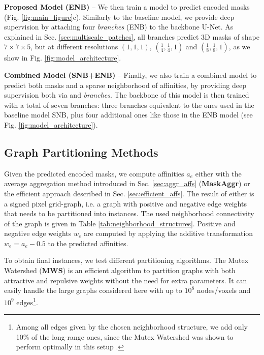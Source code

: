 \textbf{Proposed Model (ENB)} -- We then train a model to predict encoded \maskname masks (Fig. \ref{fig:main_figure}c). Similarly to the baseline model, we provide deep supervision by attaching four \emph{\encBr branches} (ENB) to the backbone U-Net. As explained in Sec. \ref{sec:multiscale_patches}, all branches predict 3D masks of shape $7 \times 7 \times 5$, but at different resolutions $(1,1,1)$, $(\frac{1}{4},\frac{1}{4},1)$ and $(\frac{1}{8},\frac{1}{8},1)$, as we show in Fig. \ref{fig:model_architecture}.

\textbf{Combined Model (SNB+ENB)} -- Finally, we also train a combined model to predict both \maskname masks and a sparse neighborhood of affinities, by providing deep supervision both via \emph{\encBr} and \emph{\sparseBr} \emph{branches}. The backbone of this model is then trained with a total of seven branches: three branches equivalent to the ones used in the baseline model SNB, plus four additional ones like those in the ENB model (see Fig. \ref{fig:model_architecture}).  

\subsection{Graph Partitioning Methods} 
Given the predicted encoded \maskname masks, we compute affinities $a_e$ either with the average aggregation method introduced in Sec. \ref{sec:aggr_affs} (\textbf{MaskAggr}) or the efficient approach described in Sec. \ref{sec:efficient_affs}. 
The result of either is a signed pixel grid-graph, i.e. a graph with positive and negative edge weights that needs to be partitioned into instances. 
The used neighborhood connectivity of the graph is given in Table \ref{tab:neighborhood_structures}. Positive and negative edge weights $w_e$ are computed by applying the additive transformation $w_e=a_e-0.5$ to the predicted affinities.


To obtain final instances, we test different partitioning algorithms.
The Mutex Watershed (\textbf{MWS}) \cite{wolf2018mutex} is an efficient algorithm to partition graphs with both attractive and repulsive weights without the need for extra parameters. It can easily handle the large graphs considered here with up to $10^8$ nodes/voxels and $10^9$ edges\footnote{Among all edges given by the chosen neighborhood structure, we add only 10\% of the long-range ones, since the Mutex Watershed was shown to perform optimally in this setup \cite{bailoni2019generalized,wolf2018mutex}.}. 

